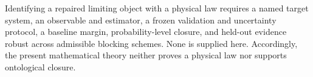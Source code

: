 Identifying a repaired limiting object with a physical law requires a named
target system, an observable and estimator, a frozen validation and
uncertainty protocol, a baseline margin, probability-level closure, and
held-out evidence robust across admissible blocking schemes.  None is
supplied here.  Accordingly, the present mathematical theory neither proves
a physical law nor supports ontological closure. 

\normalsize
